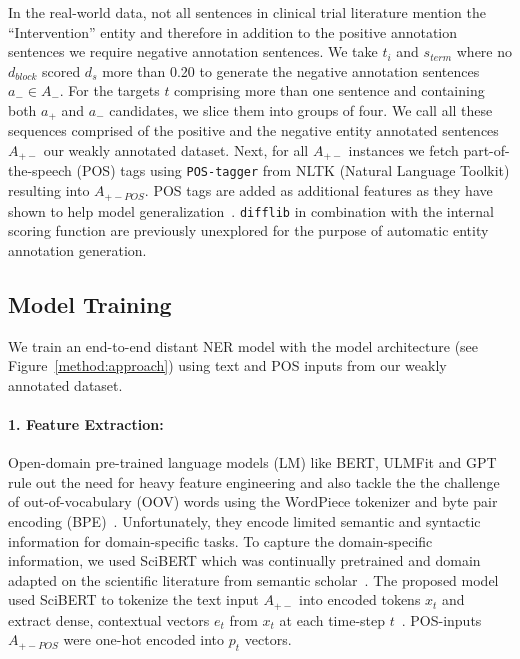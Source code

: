 \documentclass[letterpaper]{article} %
\begin{document}
In the real-world data, not all sentences in clinical trial literature mention the ``Intervention'' entity and therefore in addition to the positive annotation sentences we require negative annotation sentences.
We take $t_i$ and $s_{term}$ where no $d_{block}$ scored $d_s$ more than 0.20 to generate the negative annotation sentences $a_{-} \in A_{-}$.
For the targets $t$ comprising more than one sentence and containing both $a_{+}$ and $a_{-}$ candidates, we slice them into groups of four.
We call all these sequences comprised of the positive and the negative entity annotated sentences $A_{+-}$ our weakly annotated dataset.
Next, for all $A_{+-}$ instances we fetch part-of-the-speech (POS) tags using {\tt POS-tagger} from NLTK (Natural Language Toolkit) resulting into $A_{+-POS}$.
POS tags are added as additional features as they have shown to help model generalization~\cite{augenstein2017generalisation}.
{\tt difflib} in combination with the internal scoring function are previously unexplored for the purpose of automatic entity annotation generation. 
%
\subsection{Model Training}
\label{subsec:training}
%
We train an end-to-end distant NER model with the model architecture (see Figure~\ref{method:approach}) using text and POS inputs from our weakly annotated dataset.
%
\paragraph{1. Feature Extraction:}
%
Open-domain pre-trained language models (LM) like BERT, ULMFit and GPT rule out the need for heavy feature engineering and also tackle the the challenge of out-of-vocabulary (OOV) words using the WordPiece tokenizer and byte pair encoding (BPE)~\cite{devlin2018bert,joshi2019comparison}.
Unfortunately, they encode limited semantic and syntactic information for domain-specific tasks.
To capture the domain-specific information, we used SciBERT which was continually pretrained and domain adapted on the scientific literature from semantic scholar~\cite{gururangan2020don}.
The proposed model used SciBERT to tokenize the text input $A_{+-}$ into encoded tokens $x_{t}$ and extract dense, contextual vectors $e_{t}$ from $x_{t}$ at each time-step $t$~\cite{beltagy2019scibert}.
POS-inputs $A_{+-POS}$ were one-hot encoded into $p_{t}$ vectors.
%
\end{document}
